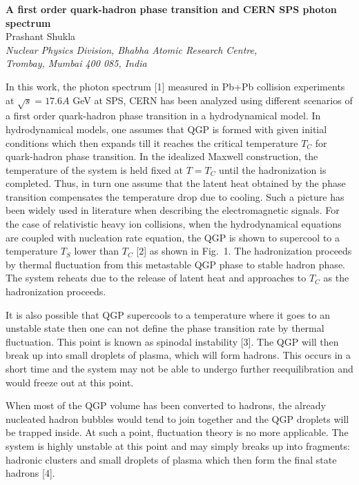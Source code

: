 \textwidth=14.5cm
\textheight=20cm
\pagestyle{empty}


\begin{center}
{\large \bf A first order quark-hadron phase transition and 
 CERN SPS photon spectrum}\\
Prashant Shukla  \\
{\it Nuclear Physics Division, 
Bhabha Atomic Research Centre,\\
Trombay, Mumbai 400 085, India}\\
\end{center}

In this work, the photon spectrum [1] measured in Pb+Pb collision 
experiments at $\sqrt s = 17.6A$ GeV at SPS, CERN has been analyzed using 
different scenarios of a first order quark-hadron phase transition
in a hydrodynamical model.
  In hydrodynamical models, one assumes that QGP is formed with given 
initial conditions which then expands till it reaches the critical 
temperature $T_C$ for quark-hadron phase transition.
  In the idealized Maxwell construction, the temperature of the system 
is held fixed at $T=T_C$ until the hadronization is completed. 
Thus, in turn one assume that the latent heat obtained by the phase 
transition compensates the temperature drop due to cooling.
Such a picture has been widely used in literature when describing
the electromagnetic signals.
 For the case of relativistic heavy ion collisions, when the
hydrodynamical equations are coupled with nucleation rate equation, 
the QGP is shown to supercool to a temperature $T_S$ lower than 
$T_C$ [2] as shown in Fig.~1. The hadronization proceeds by 
thermal fluctuation from this metastable QGP phase to stable hadron phase. 
The system reheats due to the release of latent heat and approaches to 
$T_C$ as the hadronization proceeds.

It is also possible that QGP supercools to a temperature where it goes 
to an unstable state then one can not define the phase transition rate by 
thermal fluctuation. This point is known as spinodal instability [3].
 The QGP will then break up into small droplets of plasma,
which will form hadrons. 
 This occurs in a short time and the system may not be able to undergo 
further reequilibration and would freeze out at this point. 

  When most of the QGP volume has been converted to hadrons, 
the already nucleated hadron bubbles would tend to join together and 
the QGP droplets will be trapped inside. At such a point, fluctuation 
theory is no more applicable. The system is highly unstable at this point 
and may simply breaks up into fragments: hadronic clusters and small droplets 
of plasma which then form the final state hadrons [4]. 


